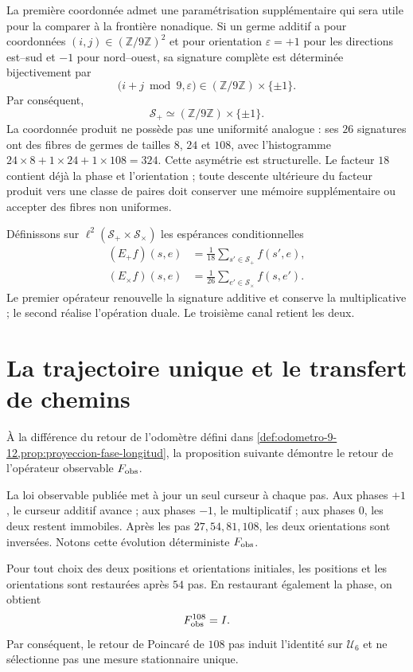 La première coordonnée admet une paramétrisation supplémentaire qui sera utile pour
la comparer à la frontière nonadique. Si un germe additif a pour coordonnées
\((i,j)\in(\mathbb Z/9\mathbb Z)^2\) et pour orientation
\(\varepsilon=+1\) pour les directions est--sud et \(-1\) pour
nord--ouest, sa signature complète est déterminée bijectivement par
\[
 \bigl(i+j\bmod9,\varepsilon\bigr)
 \in(\mathbb Z/9\mathbb Z)\times\{\pm1\}.
\]
Par conséquent,
\[
 \boxed{\mathcal S_+\simeq
 (\mathbb Z/9\mathbb Z)\times\{\pm1\}.}
\]
La coordonnée produit ne possède pas une uniformité analogue : ses \(26\) signatures
ont des fibres de germes de tailles \(8\), \(24\) et \(108\), avec l'histogramme
\(24\times8+1\times24+1\times108=324\). Cette asymétrie est structurelle. Le
facteur \(18\) contient déjà la phase et l'orientation ; toute descente ultérieure
du facteur produit vers une classe de paires doit conserver une mémoire supplémentaire ou
accepter des fibres non uniformes.

Définissons sur \(\ell^2(\mathcal S_+\times\mathcal S_\times)\) les
espérances conditionnelles
\[
\begin{aligned}
 (E_+f)(s,e)&=\frac1{18}\sum_{s'\in\mathcal S_+}f(s',e),\\
 (E_\times f)(s,e)&=\frac1{26}\sum_{e'\in\mathcal S_\times}f(s,e').
\end{aligned}
\]
Le premier opérateur renouvelle la signature additive et conserve la multiplicative ;
le second réalise l'opération duale. Le troisième canal retient les deux.

\section{La trajectoire unique et le transfert de chemins}

À la différence du retour de l'odomètre défini dans
\cref{def:odometro-9-12,prop:proyeccion-fase-longitud}, la proposition
suivante démontre le retour de l'opérateur observable \(F_{\rm obs}\).

La loi observable publiée met à jour un seul curseur à chaque pas. Aux
phases \(+1\), le curseur additif avance ; aux phases \(-1\), le
multiplicatif ; aux phases \(0\), les deux restent immobiles. Après les
pas \(27,54,81,108\), les deux orientations sont inversées. Notons cette
évolution déterministe \(F_{\rm obs}\).

\begin{proposition}
\label{prop:retorno-fobs-identidad}
Pour tout choix des deux positions et orientations initiales, les
positions et les orientations sont restaurées après \(54\) pas. En
restaurant également la phase, on obtient
\[
 F_{\rm obs}^{108}=I.
\]
Par conséquent, le retour de Poincaré de \(108\) pas induit l'identité sur
\(\mathcal U_6\) et ne sélectionne pas une mesure stationnaire unique.
\end{proposition}

